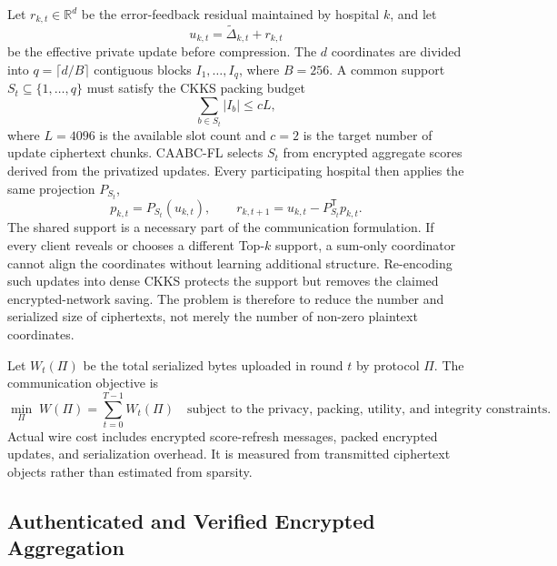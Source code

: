 Let $r_{k,t}\in\mathbb{R}^{d}$ be the error-feedback residual maintained by hospital $k$, and let
\begin{equation}
    u_{k,t}=\widetilde{\Delta}_{k,t}+r_{k,t}
    \label{eq:effective-private-update}
\end{equation}
be the effective private update before compression. The $d$ coordinates are divided into $q=\lceil d/B\rceil$ contiguous blocks $I_1,\ldots,I_q$, where $B=256$. A common support $S_t\subseteq\{1,\ldots,q\}$ must satisfy the CKKS packing budget
\begin{equation}
    \sum_{b\in S_t}|I_b|\leq cL,
    \label{eq:ciphertext-packing-constraint}
\end{equation}
where $L=4096$ is the available slot count and $c=2$ is the target number of update ciphertext chunks. CAABC-FL selects $S_t$ from encrypted aggregate scores derived from the privatized updates. Every participating hospital then applies the same projection $P_{S_t}$,
\begin{equation}
    p_{k,t}=P_{S_t}(u_{k,t}),
    \qquad
    r_{k,t+1}=u_{k,t}-P_{S_t}^{\mathsf T}p_{k,t}.
    \label{eq:problem-error-feedback}
\end{equation}
The shared support is a necessary part of the communication formulation. If every client reveals or chooses a different Top-$k$ support, a sum-only coordinator cannot align the coordinates without learning additional structure. Re-encoding such updates into dense CKKS protects the support but removes the claimed encrypted-network saving. The problem is therefore to reduce the number and serialized size of ciphertexts, not merely the number of non-zero plaintext coordinates.

Let $W_t(\Pi)$ be the total serialized bytes uploaded in round $t$ by protocol $\Pi$. The communication objective is
\begin{equation}
    \min_{\Pi}\;W(\Pi)=\sum_{t=0}^{T-1}W_t(\Pi)
    \quad\text{subject to the privacy, packing, utility, and integrity constraints.}
    \label{eq:wire-objective}
\end{equation}
Actual wire cost includes encrypted score-refresh messages, packed encrypted updates, and serialization overhead. It is measured from transmitted ciphertext objects rather than estimated from sparsity.

\subsection{Authenticated and Verified Encrypted Aggregation}
\label{subsec:problem-encrypted-aggregation}

